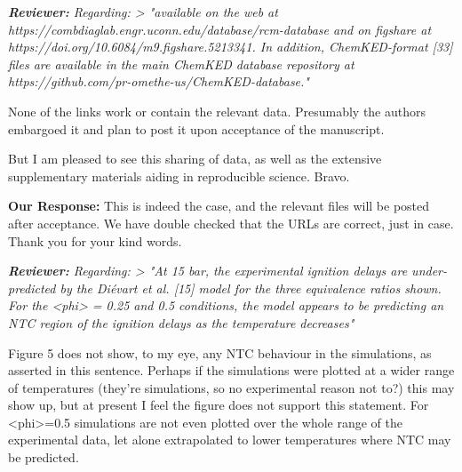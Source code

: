\documentclass{article}
\newenvironment{reviewer}{\vspace{0.5\baselineskip}\begingroup\itshape\textbf{Reviewer:}}{\endgroup\vspace{0.5\baselineskip}}
\newenvironment{response}{\vspace{0.5\baselineskip}\textbf{Our Response:}}{\vspace{0.5\baselineskip}}
\begin{document}
\begin{reviewer}
    Regarding: > "available on the web at https://combdiaglab.engr.uconn.edu/database/rcm-database
    and on figshare at https://doi.org/10.6084/m9.figshare.5213341. In addition, ChemKED-format [33]
    files are available in the main ChemKED database repository at
    https://github.com/pr-omethe-us/ChemKED-database."

    None of the links work or contain the relevant data. Presumably the authors embargoed it and
    plan to post it upon acceptance of the manuscript.

    But I am pleased to see this sharing of data, as well as the extensive supplementary materials
    aiding in reproducible science. Bravo.
\end{reviewer}

\begin{response}
    This is indeed the case, and the relevant files will be posted after acceptance. We have double
    checked that the URLs are correct, just in case. Thank you for your kind words.
\end{response}

\begin{reviewer}
    Regarding: > "At 15 bar, the experimental ignition delays are under-predicted by the Di\'{e}vart et
    al. [15] model for the three equivalence ratios shown. For the <phi> = 0.25 and 0.5 conditions,
    the model appears to be predicting an NTC region of the ignition delays as the temperature
    decreases"

    Figure 5 does not show, to my eye, any NTC behaviour in the simulations, as asserted in this
    sentence. Perhaps if the simulations were plotted at a wider range of temperatures (they're
    simulations, so no experimental reason not to?) this may show up, but at present I feel the
    figure does not support this statement. For <phi>=0.5 simulations are not even plotted over the
    whole range of the experimental data, let alone extrapolated to lower temperatures where NTC may
    be predicted.
\end{reviewer}
\end{document}

